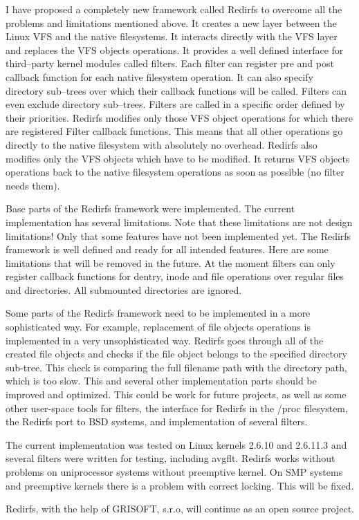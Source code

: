 I have proposed a completely new framework called Redirfs to overcome all the problems
and limitations mentioned above. It creates a new layer between the Linux VFS and the
native filesystems. It interacts directly with the VFS layer and replaces the VFS
objects operations. It provides a well defined interface for third--party kernel
modules called filters. Each filter can register pre and post callback function for
each native filesystem operation. It can also specify directory sub--trees over which
their callback functions will be called. Filters can even exclude directory sub--trees.
Filters are called in a specific order defined by their priorities. Redirfs modifies
only those VFS object operations for which there are registered Filter callback
functions. This means that all other operations go directly to the native filesystem
with absolutely no overhead. Redirfs also modifies only the VFS objects which have to
be modified. It returns VFS objects operations back to the native filesystem
operations as soon as possible (no filter needs them).

Base parts of the Redirfs framework were implemented. The current implementation has
several limitations. Note that these limitations are not design limitations! Only that
some features have not been implemented yet. The Redirfs framework is well defined and
ready for all intended features. Here are some limitations that will be removed in the
future. At the moment filters can only register callback functions for dentry, inode
and file operations over regular files and directories. All submounted directories are
ignored.

Some parts of the Redirfs framework need to be implemented in a more sophisticated
way. For example, replacement of file objects operations is implemented in a very
unsophisticated way.
Redirfs goes through all of the created file objects and checks if the file object
belongs to the specified directory sub-tree. This check is comparing the full filename
path with the directory path, which is too slow. This and several other implementation
parts should be improved and optimized. This could be work for future projects, as
well as some other user-space tools for filters, the interface for Redirfs in the
/proc filesystem, the Redirfs port to BSD systems, and implementation of several
filters.

The current implementation was tested on Linux kernels 2.6.10 and 2.6.11.3 and several
filters were written for testing, including avgflt. Redirfs works without problems on
uniprocessor systems without preemptive kernel. On SMP systems and preemptive kernels
there is a problem with correct locking. This will be fixed.

Redirfs, with the help of GRISOFT, s.r.o, will continue as an open source project.
